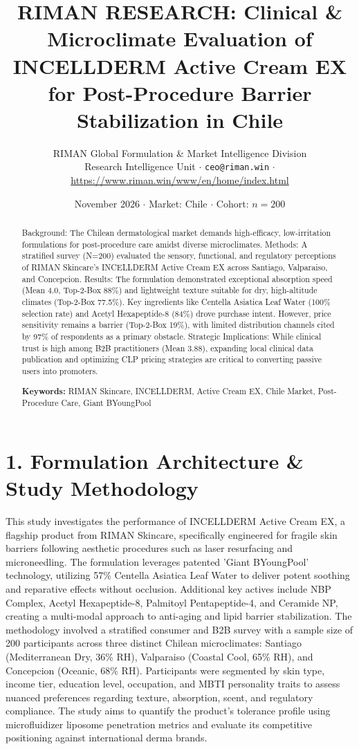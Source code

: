 \documentclass[10pt,twocolumn,a4paper]{article}
\title{\textbf{RIMAN RESEARCH: Clinical \& Microclimate Evaluation of INCELLDERM Active Cream EX for Post-Procedure Barrier Stabilization in Chile}}
\author{RIMAN Global Formulation \& Market Intelligence Division\\
\small Research Intelligence Unit $\cdot$ \texttt{ceo@riman.win} $\cdot$ \url{https://www.riman.win/www/en/home/index.html}}
\date{November 2026 \quad $\cdot$ \quad Market: Chile \quad $\cdot$ \quad Cohort: $n = 200$}
\begin{document}
\maketitle

\begin{abstract}
Background: The Chilean dermatological market demands high-efficacy, low-irritation formulations for post-procedure care amidst diverse microclimates. Methods: A stratified survey (N=200) evaluated the sensory, functional, and regulatory perceptions of RIMAN Skincare's INCELLDERM Active Cream EX across Santiago, Valparaiso, and Concepcion. Results: The formulation demonstrated exceptional absorption speed (Mean 4.0, Top-2-Box 88\%) and lightweight texture suitable for dry, high-altitude climates (Top-2-Box 77.5\%). Key ingredients like Centella Asiatica Leaf Water (100\% selection rate) and Acetyl Hexapeptide-8 (84\%) drove purchase intent. However, price sensitivity remains a barrier (Top-2-Box 19\%), with limited distribution channels cited by 97\% of respondents as a primary obstacle. Strategic Implications: While clinical trust is high among B2B practitioners (Mean 3.88), expanding local clinical data publication and optimizing CLP pricing strategies are critical to converting passive users into promoters.

\vspace{0.4em}
\noindent\textbf{Keywords:} RIMAN Skincare, INCELLDERM, Active Cream EX, Chile Market, Post-Procedure Care, Giant BYoungPool
\end{abstract}

\section{1. Formulation Architecture \& Study Methodology}
This study investigates the performance of INCELLDERM Active Cream EX, a flagship product from RIMAN Skincare, specifically engineered for fragile skin barriers following aesthetic procedures such as laser resurfacing and microneedling. The formulation leverages patented 'Giant BYoungPool' technology, utilizing 57\% Centella Asiatica Leaf Water to deliver potent soothing and reparative effects without occlusion. Additional key actives include NBP Complex, Acetyl Hexapeptide-8, Palmitoyl Pentapeptide-4, and Ceramide NP, creating a multi-modal approach to anti-aging and lipid barrier stabilization. The methodology involved a stratified consumer and B2B survey with a sample size of 200 participants across three distinct Chilean microclimates: Santiago (Mediterranean Dry, 36\% RH), Valparaiso (Coastal Cool, 65\% RH), and Concepcion (Oceanic, 68\% RH). Participants were segmented by skin type, income tier, education level, occupation, and MBTI personality traits to assess nuanced preferences regarding texture, absorption, scent, and regulatory compliance. The study aims to quantify the product's tolerance profile using microfluidizer liposome penetration metrics and evaluate its competitive positioning against international derma brands.
\end{document}
